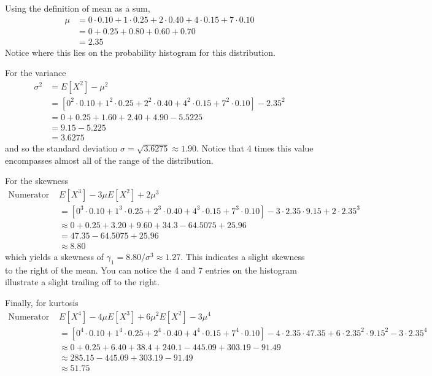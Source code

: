 \documentclass[10pt,]{book}
\numberwithin{equation}{section}
\begin{document}
\par
\hypertarget{p-734}{}%
Using the definition of mean as a sum,%
\begin{align*}
\mu & = 0 \cdot 0.10 + 1 \cdot 0.25 + 2 \cdot 0.40 + 4 \cdot 0.15 + 7 \cdot 0.10\\
& = 0 + 0.25 + 0.80 + 0.60 + 0.70\\
& = 2.35
\end{align*}
Notice where this lies on the probability histogram for this distribution.%
\par
\hypertarget{p-735}{}%
For the variance%
\begin{align*}
\sigma^2 & = E[X^2] - \mu^2\\
& = \left [ 0^2 \cdot 0.10 + 1^2 \cdot 0.25 + 2^2 \cdot 0.40 + 4^2 \cdot 0.15 + 7^2 \cdot 0.10 \right ] - 2.35^2\\
& = 0 + 0.25 + 1.60 + 2.40 + 4.90 - 5.5225\\
& = 9.15 - 5.225\\
& = 3.6275 
\end{align*}
and so the standard deviation \(\sigma = \sqrt{3.6275} \approx 1.90\). Notice that 4 times this value encompasses almost all of the range of the distribution.%
\par
\hypertarget{p-736}{}%
For the skewness%
\begin{align*}
\text{Numerator = } & E[X^3] - 3 \mu E[X^2] + 2\mu^3\\
& = \left [ 0^3 \cdot 0.10 + 1^3 \cdot 0.25 + 2^3 \cdot 0.40 + 4^3 \cdot 0.15 + 7^3 \cdot 0.10 \right ] - 3 \cdot 2.35 \cdot 9.15 + 2 \cdot 2.35^3\\
& \approx 0 + 0.25 + 3.20 + 9.60 + 34.3 - 64.5075 + 25.96\\
& = 47.35 - 64.5075 + 25.96\\
& \approx 8.80
\end{align*}
which yields a skewness of \(\gamma_1 = 8.80 / \sigma^3 \approx 1.27 \). This indicates a slight skewness to the right of the mean. You can notice the 4 and 7 entries on the histogram illustrate a slight trailing off to the right.%
\par
\hypertarget{p-737}{}%
Finally, for kurtosis%
\begin{align*}
\text{Numerator = } & E[X^4] - 4 \mu E[X^3] + 6 \mu^2 E[X^2] - 3\mu^4\\
& = \left [ 0^4 \cdot 0.10 + 1^4 \cdot 0.25 + 2^4 \cdot 0.40 + 4^4 \cdot 0.15 + 7^4 \cdot 0.10 \right ] - 4 \cdot 2.35 \cdot 47.35 + 6 \cdot 2.35^2 \cdot 9.15^2 - 3 \cdot 2.35^4\\
& \approx 0 + 0.25 + 6.40 + 38.4 + 240.1 - 445.09 + 303.19 - 91.49\\
& \approx 285.15 - 445.09 + 303.19 - 91.49\\
& \approx 51.75
\end{align*}
\end{document}
